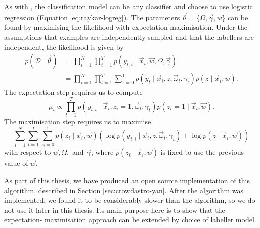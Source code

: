         As with \citeauthor{raykar10}, the classification model can be any
        classifier and \citeauthor{yan10} choose to use logistic regression
        (Equation \ref{eq:raykar-logreg}). The parameters $\vec \theta =
        \{\Omega, \vec \gamma, \vec w\}$ can be found by maximising the
        likelihood with expectation-maximisation. Under the assumptions that
        examples are independently sampled and that the labellers are
        independent, the likelihood is given by
        \begin{align*}
            p(\mathcal D \mid \vec \theta)
                &= \prod_{i = 1}^N \prod_{t = 1}^T
                    p(y_{t, i} \mid \vec x_i, \vec w, \Omega, \vec \gamma)\\
                &= \prod_{i = 1}^N \prod_{t = 1}^T \sum_{z = 0}^1
                    p(y_t \mid \vec x_i, z, \vec \omega_t, \gamma_t)
                    p(z \mid \vec x_i, \vec w).
        \end{align*}
        The expectation step requires us to compute
        \[
            \mu_i \propto \prod_{t = 1}^{T}
                p(y_{t, i} \mid \vec x_i, z_i = 1, \vec \omega_t, \gamma_t)
                p(z_i = 1 \mid \vec x_i, \vec w).
        \]
        The maximisation step requires us to maximise
        \begin{equation*}
            \sum_{i = 1}^N \sum_{t = 1}^T \sum_{z_i = 0}^1
                p(z_i \mid \vec x_i, \vec w) (
                    \log p(y_{t, i} \mid \vec x_i, z, \vec \omega_t, \gamma_t) +
                    \log p(z \mid \vec x_i, \vec w))
        \end{equation*}
        with respect to $\vec w, \Omega,$ and $\vec \gamma$, where $p(z_i \mid
        \vec x_i, \vec w)$ is fixed to use the previous value of $\vec w$.

        As part of this thesis, we have produced an open source implementation
        of this algorithm, described in Section \ref{sec:crowdastro-yan}. After
        the algorithm was implemented, we found it to be considerably slower
        than the \citeauthor{raykar10} algorithm, so we do not use it later in
        this thesis. Its main purpose here is to show that the expectation-
        maximisation approach can be extended by choice of labeller model.

